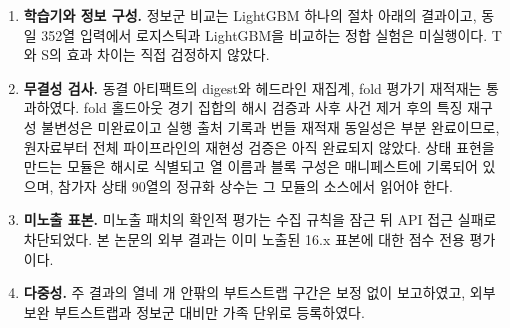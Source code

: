 \begin{enumerate}[leftmargin=2em]
  \item \textbf{학습기와 정보 구성.} 정보군 비교는 LightGBM 하나의 절차 아래의 결과이고, 동일 352열 입력에서 로지스틱과 LightGBM을 비교하는 정합 실험은 미실행이다. T와 S의 효과 차이는 직접 검정하지 않았다.
  \item \textbf{무결성 검사.} 동결 아티팩트의 digest와 헤드라인 재집계, fold 평가기 재적재는 통과하였다. fold 홀드아웃 경기 집합의 해시 검증과 사후 사건 제거 후의 특징 재구성 불변성은 미완료이고 실행 출처 기록과 번들 재적재 동일성은 부분 완료이므로, 원자료부터 전체 파이프라인의 재현성 검증은 아직 완료되지 않았다. 상태 표현을 만드는 모듈은 해시로 식별되고 열 이름과 블록 구성은 매니페스트에 기록되어 있으며, 참가자 상태 90열의 정규화 상수는 그 모듈의 소스에서 읽어야 한다.
  \item \textbf{미노출 표본.} 미노출 패치의 확인적 평가는 수집 규칙을 잠근 뒤 API 접근 실패로 차단되었다. 본 논문의 외부 결과는 이미 노출된 16.x 표본에 대한 점수 전용 평가이다.
  \item \textbf{다중성.} 주 결과의 열네 개 안팎의 부트스트랩 구간은 보정 없이 보고하였고, 외부 보완 부트스트랩과 정보군 대비만 가족 단위로 등록하였다.
\end{enumerate}
